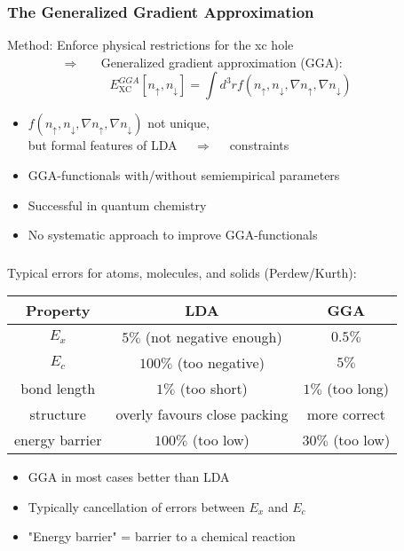 \documentclass[compress]{beamer}
\begin{document}
\frame
{ 
  \frametitle{The Generalized Gradient Approximation}
  \begin{small}
    {\scriptsize
      Method: \alert{Enforce} physical \alert{restrictions} for the xc hole\\
      $\qquad \qquad $ $\Longrightarrow $ $\quad $ Generalized gradient approximation (GGA):
      \begin{equation}
        E_{\mathrm{XC}}^{GGA}[n_{\uparrow },n_{\downarrow }]=\int d^{3}r f(n_{\uparrow },n_{\downarrow },\nabla n_{\uparrow },\nabla n_{\downarrow }) \nonumber
      \end{equation}
      
      
      \begin{itemize}
      \item $f(n_{\uparrow },n_{\downarrow },\nabla n_{\uparrow },\nabla n_{\downarrow })$ not unique, \\ 
        but formal features of LDA $\quad \Longrightarrow \quad $ constraints
      \item GGA-functionals with/without semiempirical parameters
      \item Successful in quantum chemistry 
      \item No systematic approach to improve GGA-functionals
      \end{itemize}
    }
  \end{small}
}

\frame
{ 
  \frametitle{}
  \begin{small}
    {\scriptsize
      \alert{Typical errors} for atoms, molecules, and solids (Perdew/Kurth):
      \begin{center}
        \begin{tabular}{c c c}
          \hline
          Property & LDA & GGA \\
          \hline
          $E_{x}$ & $5\% $ (not negative enough) & $0.5\% $\\
          $E_{c}$ & $100\% $ (too negative) & $5\% $\\
          bond length & $1\% $ (too short) & $1\% $ (too long) \\
          structure & overly favours close packing & more correct \\
          energy barrier & $100\% $ (too low) & $30\% $ (too low) \\
          \hline
        \end{tabular}
      \end{center}
      \vspace{2mm}
      \begin{itemize}
      \item GGA in most cases better than LDA  
      \item Typically cancellation of errors between $E_{x}$ and $E_{c}$
      \item "Energy barrier" = barrier to a chemical reaction
      \end{itemize}
    }
  \end{small}
}
\end{document}
